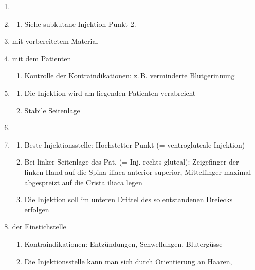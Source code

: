 \begin{FamPropHandlungsschritte}
\begin{enumerate}
  \item {}
  \item {}
  \begin{enumerate}
    \item Siehe subkutane Injektion Punkt 2.
  \end{enumerate}
  \item {} mit
  vorbereitetem Material
  \item {} mit dem Patienten
  \begin{enumerate}
    \item Kontrolle der Kontraindikationen: z.\,B. verminderte
    Blutgerinnung
  \end{enumerate}
  \item {}
  \begin{enumerate}
    \item Die Injektion wird am liegenden Patienten verabreicht
    \item Stabile Seitenlage
  \end{enumerate}
  \item {}
  \item {}
  \begin{enumerate}
    \item Beste Injektionsstelle: Hochstetter-Punkt (= ventrogluteale Injektion)
    \item Bei linker Seitenlage des Pat. (= Inj. rechts gluteal):
    Zeigefinger der linken Hand auf die Spina iliaca anterior superior,
    Mittelfinger maximal abgespreizt auf die Crista iliaca legen
    \item Die Injektion soll im unteren Drittel des so entstandenen Dreiecks
    erfolgen
%  
  \end{enumerate}
  \item {} der Einstichstelle
  \begin{enumerate}
    \item Kontraindikationen: Entzündungen, Schwellungen, Blutergüsse
    \item Die Injektionsstelle kann man sich durch Orientierung an Haaren,

\end{enumerate}
\end{enumerate}
\end{FamPropHandlungsschritte}

